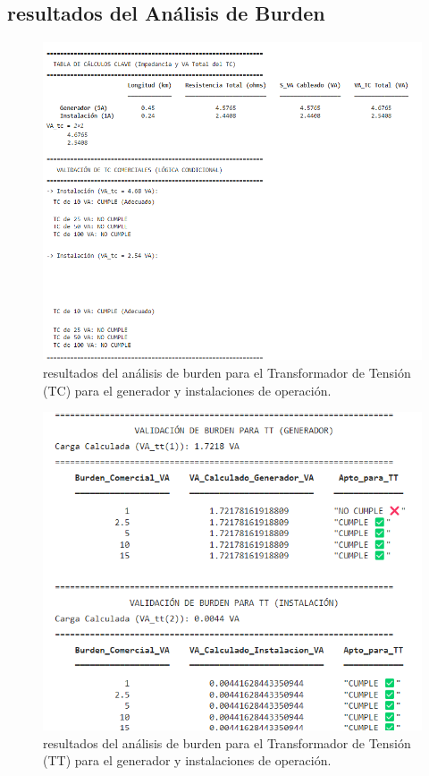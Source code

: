 \subsection{resultados del Análisis de Burden}
\begin{figure}[H]
    \centering
    \includegraphics[width=0.8\columnwidth]{figs/6 TC.png} %
    \caption{resultados del análisis de burden para el Transformador de Tensión (TC) para el generador y instalaciones de operación.}
    \label{fig:TC}
\end{figure}

\begin{figure}[H]
    \centering
    \includegraphics[width=0.8\columnwidth]{figs/6 TT.png} %
    \caption{resultados del análisis de burden para el Transformador de Tensión (TT) para el generador y instalaciones de operación.}
    \label{fig:TT}
\end{figure}

